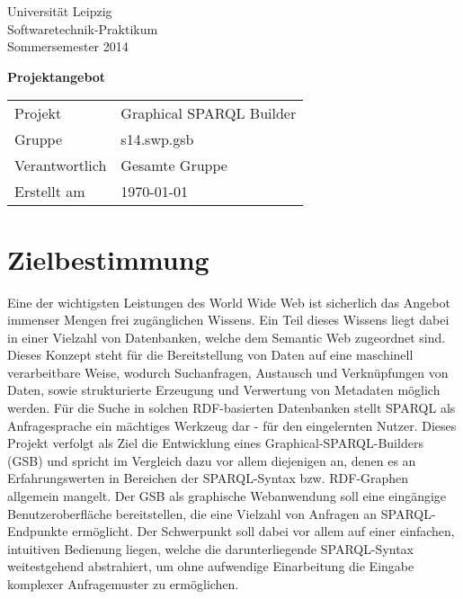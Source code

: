 
\def\verantwortlicher{Gesamte Gruppe} %
\thispagestyle{empty} 

\vspace*{2\baselineskip}

\begin{center}
\sffamily
Universität Leipzig\\
Softwaretechnik-Praktikum\\
Sommersemester 2014
\baselineskip

\bgroup
\Huge\textbf{Projektangebot}
\egroup
{}\baselineskip

\begin{tabular}{ll}
Projekt & Graphical SPARQL Builder \\
Gruppe & s14.swp.gsb \\
Verantwortlich & \verantwortlicher\\
Erstellt am & \today \\
\end{tabular}
\end{center}

\vfill%

\tableofcontents

\pagebreak

\section{Zielbestimmung}

Eine der wichtigsten Leistungen des World Wide Web ist sicherlich das
Angebot immenser Mengen frei zugänglichen Wissens.
Ein Teil dieses Wissens liegt dabei in einer Vielzahl von Datenbanken,
welche dem Semantic Web zugeordnet sind.
Dieses Konzept steht für die Bereitstellung von Daten auf eine maschinell verarbeitbare Weise, wodurch Suchanfragen, Austausch und Verknüpfungen von Daten, sowie strukturierte Erzeugung und Verwertung von Metadaten möglich werden.
Für die Suche in solchen RDF-basierten Datenbanken stellt SPARQL als
Anfragesprache ein mächtiges Werkzeug dar - für den eingelernten
Nutzer. 
Dieses Projekt verfolgt als Ziel die Entwicklung eines Graphical-SPARQL-Builders
(GSB) und spricht im Vergleich dazu vor allem diejenigen an, denen es
an Erfahrungswerten in Bereichen der SPARQL-Syntax bzw. RDF-Graphen
allgemein mangelt.
Der GSB als graphische Webanwendung soll eine eingängige
Benutzeroberfläche bereitstellen, die eine Vielzahl von Anfragen an
SPARQL-Endpunkte ermöglicht.
Der Schwerpunkt soll dabei vor allem auf einer einfachen, intuitiven Bedienung liegen, welche die darunterliegende SPARQL-Syntax weitestgehend abstrahiert, um ohne aufwendige Einarbeitung die Eingabe komplexer Anfragemuster zu ermöglichen.


